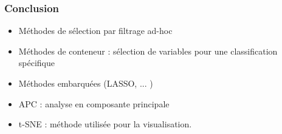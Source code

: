\begin{frame}
\frametitle{Conclusion}
\begin{itemize}
	\item Méthodes de sélection par filtrage ad-hoc
	\item Méthodes de conteneur : sélection de variables pour une classification spécifique
	\item Méthodes embarquées (LASSO, ... )
	\item APC : analyse en composante principale
	\item t-SNE : méthode utilisée pour la visualisation. 
\end{itemize}
\end{frame}



